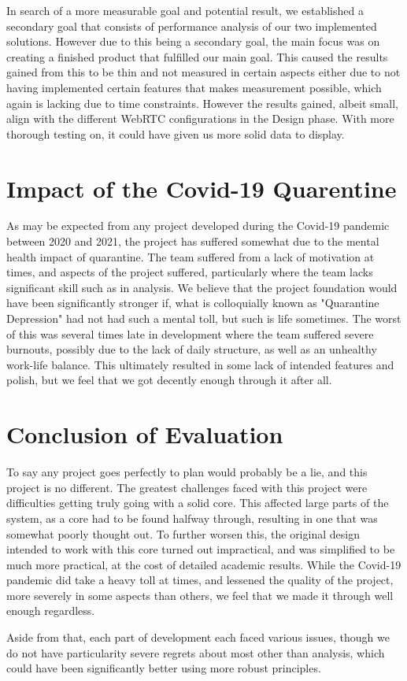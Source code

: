 In search of a more measurable goal and potential result, we established a secondary goal that consists of performance analysis of our two implemented solutions. However due to this being a secondary goal, the main focus was on creating a finished product that fulfilled our main goal. This caused the results gained from this to be thin and not measured in certain aspects either due to not having implemented certain features that makes measurement possible, which again is lacking due to time constraints. However the results gained, albeit small, align with the different WebRTC configurations in the Design phase. With more thorough testing on, it could have given us more solid data to display.

\section{Impact of the Covid-19 Quarentine}

As may be expected from any project developed during the Covid-19 pandemic between 2020 and 2021, the project has suffered somewhat due to the mental health impact of quarantine. The team suffered from a lack of motivation at times, and aspects of the project suffered, particularly where the team lacks significant skill such as in analysis. We believe that the project foundation would have been significantly stronger if, what is colloquially known as "Quarantine Depression" had not had such a mental toll, but such is life sometimes. The worst of this was several times late in development where the team suffered severe burnouts, possibly due to the lack of daily structure, as well as an unhealthy work-life balance. This ultimately resulted in some lack of intended features and polish, but we feel that we got decently enough through it after all.

\section{Conclusion of Evaluation}

To say any project goes perfectly to plan would probably be a lie, and this project is no different. The greatest challenges faced with this project were difficulties getting truly going with a solid core. This affected large parts of the system, as a core had to be found halfway through, resulting in one that was somewhat poorly thought out. To further worsen this, the original design intended to work with this core turned out impractical, and was simplified to be much more practical, at the cost of detailed academic results. While the Covid-19 pandemic did take a heavy toll at times, and lessened the quality of the project, more severely in some aspects than others, we feel that we made it through well enough regardless.

Aside from that, each part of development each faced various issues, though we do not have particularity severe regrets about most other than analysis, which could have been significantly better using more robust principles.